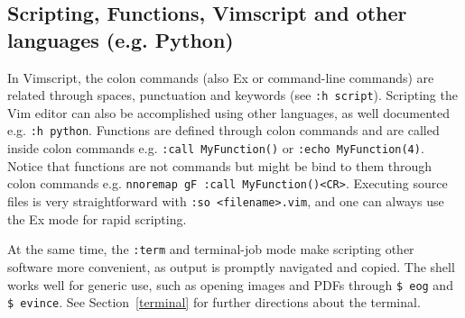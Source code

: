 \documentclass{article}
\newcommand{\tttt}[1]{\texttt{#1}}
\begin{document}
\subsection{Scripting, Functions, Vimscript and other languages (e.g.  Python)}\label{script}
In Vimscript,
the colon commands (also Ex or command-line commands) are related through spaces,
punctuation and keywords (see \texttt{:h script}).
Scripting the Vim editor can also be accomplished using other languages,
as well documented e.g. \tttt{:h python}.
Functions are defined through colon commands and are called
inside colon commands e.g. \tttt{:call MyFunction()}
or \tttt{:echo MyFunction(4)}.
Notice that functions are not commands but might be bind to them
through colon commands e.g. \tttt{nnoremap gF :call MyFunction()<CR>}.
Executing source files is very straightforward with \tttt{:so
<filename>.vim},
and one can always use the Ex mode for rapid scripting.

At the same time, the \tttt{:term} and terminal-job mode make
scripting other software more convenient, as output is
promptly navigated and copied. The shell works well for generic use,
such as opening images and PDFs through \tttt{\$ eog} and \tttt{\$ evince}.
See Section~\ref{terminal} for further directions about the terminal.
\end{document}
